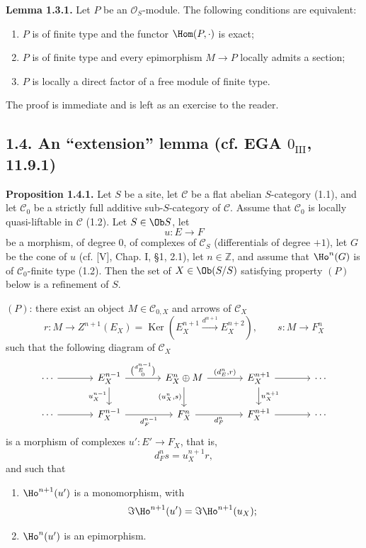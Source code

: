 \documentclass[11pt]{article}
\providecommand{\Ker}{\operatorname{Ker}}
\begin{document}
\textbf{Lemma 1.3.1.} Let \(P\) be an \(\mathcal O_S\)-module. The following conditions are equivalent:
\begin{enumerate}[label=(\roman*)]
\item \(P\) is of finite type and the functor \(\Hom(P,\cdot)\) is exact;
\item \(P\) is of finite type and every epimorphism \(M\to P\) locally admits a section;
\item \(P\) is locally a direct factor of a free module of finite type.
\end{enumerate}
The proof is immediate and is left as an exercise to the reader.

\subsection*{1.4. An ``extension'' lemma (cf. EGA \(0_{\mathrm{III}}\), 11.9.1)}

\textbf{Proposition 1.4.1.} Let \(S\) be a site, let \(\mathcal C\) be a flat abelian \(S\)-category (1.1), and let \(\mathcal C_0\) be a strictly full additive sub-\(S\)-category of \(\mathcal C\). Assume that \(\mathcal C_0\) is locally quasi-liftable in \(\mathcal C\) (1.2). Let \(S\in\Ob S\), let
\[
  u:E\longrightarrow F
\]
be a morphism, of degree \(0\), of complexes of \(\mathcal C_S\) (differentials of degree \(+1\)), let \(G\) be the cone of \(u\) (cf. [V], Chap. I, §1, 2.1), let \(n\in\mathbb Z\), and assume that \(\Ho^n(G)\) is of \(\mathcal C_0\)-finite type (1.2). Then the set of \(X\in\Ob(S/S)\) satisfying property \((P)\) below is a refinement of \(S\).

\((P)\): there exist an object \(M\in\mathcal C_{0,X}\) and arrows of \(\mathcal C_X\)
\[
  r:M\longrightarrow Z^{n+1}(E_X)=
  \Ker\!\left(E_X^{n+1}\xrightarrow{d^{n+1}}E_X^{n+2}\right),
  \qquad
  s:M\longrightarrow F_X^n
\]
such that the following diagram of \(\mathcal C_X\)
\[
\begin{tikzcd}[column sep=large]
\cdots \arrow[r] & E_X^{n-1}
 \arrow[r,"{\binom{d_E^{n-1}}{0}}"]
 \arrow[d,"u_X^{n-1}"'] &
E_X^n\oplus M
 \arrow[r,"{(d_E^n,r)}"]
 \arrow[d,"{(u_X^n,s)}"'] &
E_X^{n+1} \arrow[r] \arrow[d,"u_X^{n+1}"] &
\cdots\\
\cdots \arrow[r] & F_X^{n-1} \arrow[r,"d_F^{n-1}"'] &
F_X^n \arrow[r,"d_F^n"'] &
F_X^{n+1} \arrow[r] &
\cdots
\end{tikzcd}
\]
is a morphism of complexes \(u':E'\to F_X\), that is,
\[
  d_F^n s=u_X^{n+1}r,
\]
and such that
\begin{enumerate}[label=(\roman*)]
\item \(\Ho^{n+1}(u')\) is a monomorphism, with
\[
  \Im\Ho^{n+1}(u')=\Im\Ho^{n+1}(u_X);
\]
\item \(\Ho^n(u')\) is an epimorphism.
\end{enumerate}
\end{document}
